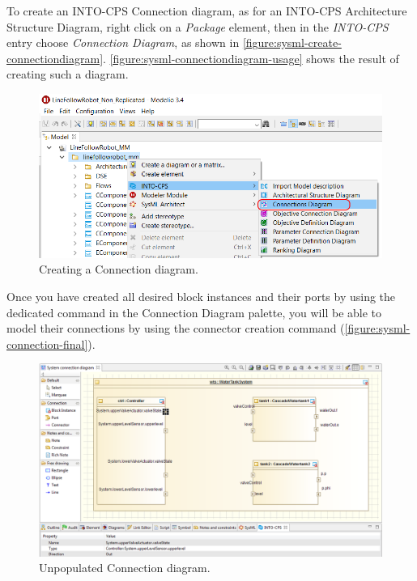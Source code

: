 %
To create an INTO-CPS Connection diagram, as for an INTO-CPS Architecture Structure Diagram, right click on a \textit{Package} element, then in the \textit{INTO-CPS} entry choose \textit{Connection Diagram}, as shown in \autoref{figure:sysml-create-connectiondiagram}.
%
\autoref{figure:sysml-connectiondiagram-usage} shows the result of creating such a diagram.
%
%
%
\begin{figure}[hpt!]
\centering
\includegraphics[width=\textwidth]{./figures/sysml-create-connectiondiagram.png}
\caption{Creating a Connection diagram.}
\label{figure:sysml-create-connectiondiagram}
\end{figure}
%
%
%
Once you have created all desired block instances and their ports by using the dedicated command in the Connection Diagram palette, you will be able to model their connections by using the connector creation command (\autoref{figure:sysml-connection-final}).
%
%
%
\begin{figure}[hpt!]
\centering
\includegraphics[width=\textwidth]{./figures/sysml-connectiondiagram-usage.png}
\caption{Unpopulated Connection diagram.}
\label{figure:sysml-connectiondiagram-usage}
\end{figure}
%
%
%
